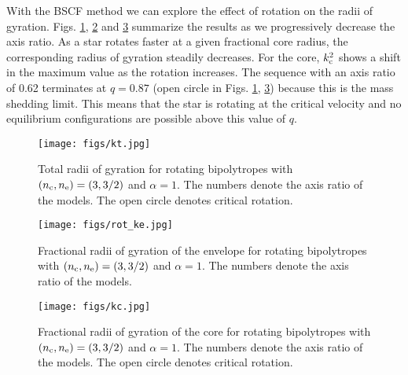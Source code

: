 \documentclass[a4paper,fleqn,usenatbib]{mnras}
\begin{document}

With the BSCF method we can explore the effect of rotation on the radii of gyration.
Figs. \ref{fig:kt2}, \ref{fig:ke2} and \ref{fig:kc2} summarize the results as we progressively decrease the axis ratio. 
As a star rotates faster at a given fractional core radius, the corresponding radius of gyration steadily decreases. For the core, $k_{\rm c}^2$ shows a shift in the maximum value as the rotation increases. The sequence with an axis ratio of 0.62 terminates at $q=0.87$ (open circle in Figs. \ref{fig:kt2}, \ref{fig:kc2}) because this is the mass shedding limit. This means that the star is rotating at the critical velocity and no equilibrium configurations are possible above this value of $q$.

\begin{figure} 
\centering
\texttt{[image: figs/kt.jpg]}
\caption{Total radii of gyration for rotating bipolytropes with $(n_{\rm c},n_{\rm e})=(3,3/2)$ and $\alpha=1$.  The numbers denote the axis ratio of the models. The open circle denotes critical rotation.}
\label{fig:kt2}
\end{figure} 

 \begin{figure} 
\centering
\texttt{[image: figs/rot\_ke.jpg]}
\caption{Fractional radii of gyration of the envelope for rotating bipolytropes with $(n_{\rm c},n_{\rm e})=(3,3/2)$ and $\alpha=1$.  The numbers denote the axis ratio of the models.}
\label{fig:ke2}
\end{figure} 

 \begin{figure} 
\centering
\texttt{[image: figs/kc.jpg]}
\caption{Fractional radii of gyration of the core for rotating bipolytropes with $(n_{\rm c},n_{\rm e})=(3,3/2)$ and $\alpha=1$.  The numbers denote the axis ratio of the models. The open circle denotes critical rotation.}
\label{fig:kc2}
\end{figure} 
\end{document}
